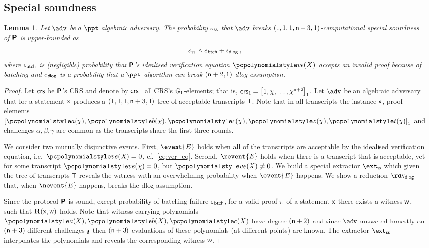 \let\accentvec\vec \documentclass[runningheads,10pt]{llncs}
\newtheorem{lemma}[theorem]{Lemma}
\begin{document}
\subsection{Special soundness}
\begin{lemma}
	\label{lem:plonkprot_ss}
	Let $\adv$ be a $\ppt$ algebraic adversary. The probability $\varepsilon_{\mathsf{ss}}$ that $\adv$ breaks 
	 $(1, 1, 1, \mathsf{n} + 3, 1)$-computational special soundness of $\bm{\mathsf{P}}$ is upper-bounded as
	 \[
	 	\varepsilon_{\mathsf{ss}} \leq \varepsilon_{\mathsf{btch}} + \varepsilon_{\mathsf{dlog}}\,,
	 \] 
	 where $\varepsilon_{\mathsf{btch}}$ is (negligible) probability that $\bm{\mathsf{P}}$'s idealised verification equation $\vereq(X)$ accepts an invalid proof because of batching and $\varepsilon_{\mathsf{dlog}}$ is a probability that a $\ppt$ algorithm can break $(\mathsf{n} + 2, 1)$-dlog assumption.
\end{lemma}
\begin{proof}
	Let $\mathsf{crs}$ be $\bm{\mathsf{P}}$'s CRS and denote by $\mathsf{crs}_1$ all CRS's $\mathbb{G}_1$-elements; that is, $\mathsf{crs}_1 = \left[1, \chi, \ldots, \chi^{\mathsf{n} + 2}\right]_{1}$. 
	Let $\adv$ be an algebraic adversary that for a statement $\mathsf{x}$ produces a $(1, 1, 1, \mathsf{n} + 3, 1)$-tree of acceptable transcripts $\mathsf{T}$. %
	Note that in all transcripts the instance $\mathsf{x}$, proof elements $\gone{\p{a}(\chi), \p{b}(\chi), \p{c}(\chi), \p{z}(\chi), \p{t}(\chi)}$ and challenges $\alpha, \beta, \gamma$ are common as the transcripts share the first three rounds. 
	
	We consider two mutually disjunctive events. 
	First, $\event{E}$ holds when all of the transcripts are acceptable by the idealised verification equation, i.e.~$\vereq(X) = 0$, cf.~\cref{eq:ver_eq}.
	Second, $\nevent{E}$ holds when there is a transcript that is acceptable, yet 
	for some transcript $\vereq(\chi) = 0$, but $\vereq(X) \neq 0$.
	We build a special extractor $\extss$ which given the tree of transcripts $\mathsf{T}$ reveals the witness with an overwhelming probability when $\event{E}$ happens. 
	We show a reduction $\rdvdlog$ that, when $\nevent{E}$ happens, breaks the dlog assumption. 
	
	  Since the protocol $\bm{\mathsf{P}}$ is sound,
	except probability of batching failure $\varepsilon_{\mathsf{btch}}$, for a valid proof
	$\pi$ of a statement $\mathsf{x}$ there exists a witness $\mathsf{w}$, such that
	$\mathbf{R}(\mathsf{x}, \mathsf{w})$ holds.  Note that witness-carrying polynomials $\p{a}(X),
	\p{b}(X), \p{c}(X)$ have degree $(\mathsf{n} + 2)$ and since $\adv$
	answered honestly on $(\mathsf{n} + 3)$ different challenges $\mathfrak{z}$
	then $(\mathsf{n} + 3)$ evaluations of these polynomials (at
	different points) are known. The extractor $\extss$ interpolates the
	polynomials and reveals the corresponding witness $\mathsf{w}$. 
	

\end{proof}
\end{document}
